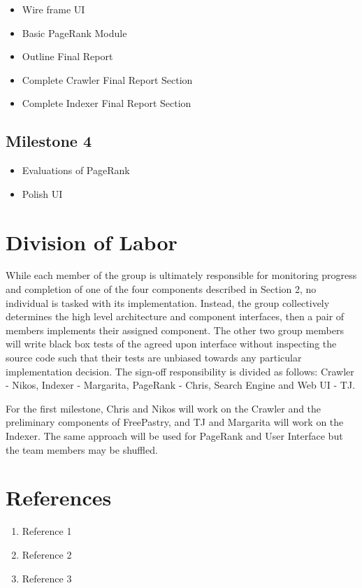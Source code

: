 \documentclass[11pt, letterpaper, oneside, twocolumn]{article}
\begin{document}
\begin{itemize}
\item            Wire frame UI
\item            Basic PageRank Module
\item            Outline Final Report
\item            Complete Crawler Final Report Section
\item            Complete Indexer Final Report Section
\end{itemize}


\subsection{Milestone 4}

\begin{itemize}
\item            Evaluations of PageRank
\item            Polish UI
\end{itemize}


\section{ Division of Labor }

While each member of the group is ultimately responsible for monitoring progress and completion of one of the four components described in Section 2, no individual is tasked with its implementation.  Instead, the group collectively determines the high level architecture and component interfaces, then a pair of members implements their assigned component.  The other two group members will write black box tests of the agreed upon interface without inspecting the source code such that their tests are unbiased towards any particular implementation decision. The sign-off responsibility is divided as follows: Crawler - Nikos, Indexer - Margarita, PageRank - Chris, Search Engine and Web UI - TJ.

For the first milestone, Chris and Nikos will work on the Crawler and the preliminary components of FreePastry, and TJ and Margarita will work on the Indexer. The same approach will be used for PageRank and User Interface but the team members may be shuffled.


\section{References}

\begin{enumerate}
\item Reference 1
\item Reference 2
\item Reference 3
\end{enumerate}
\end{document}
